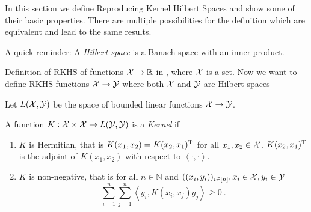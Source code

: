 In this section we define Reproducing Kernel Hilbert Spaces and show some of their basic properties.
There are multiple possibilities for the definition which are equivalent and lead to the same results.

A quick reminder: A \emph{Hilbert space} is a Banach space with an inner product.

Definition of RKHS of functions $\mathcal{X} \rightarrow \mathbb{R}$ in \cite{sejdinovic12}, where $\mathcal{X}$ is a set.
Now we want to define RKHS functions $\mathcal{X} \rightarrow \mathcal{Y}$ where both $\mathcal{X}$ and $\mathcal{Y}$ are Hilbert spaces

Let $L(\mathcal{X}, \mathcal{Y})$ be the space of bounded linear functions $\mathcal{X} \rightarrow \mathcal{Y}$.

\begin{definition}
	\label{def:kernel}
	A function $K: \mathcal{X} \times \mathcal{X} \rightarrow L(\mathcal{Y}, \mathcal{Y})$ is a \emph{Kernel} if
	\begin{enumerate}
		\item $K$ is Hermitian, that is $K(x_1, x_2) = K(x_2, x_1)^{\mathrm{T}}$ for all $x_1, x_2 \in \mathcal{X}$. 
		$K(x_2, x_1)^{\mathrm{T}}$ is the adjoint of $K(x_1, x_2)$ with respect to $\left<\cdot, \cdot\right>$.
		\item $K$ is non-negative, that is for all $n \in \mathbb{N}$ and $((x_i, y_i))_{i \in [n]}, x_i \in \mathcal{X}, y_i \in \mathcal{Y}$
		\begin{equation}
			\sum_{i=1}^n \sum_{j=1}^n \left< y_i, K(x_i, x_j)  y_j\right> \geq 0 \ .
		\end{equation}
	\end{enumerate}
\end{definition}

